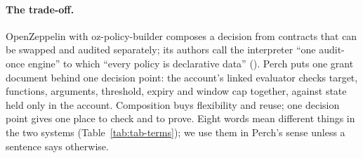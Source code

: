 \paragraph{The trade-off.} OpenZeppelin with oz-policy-builder composes a
decision from contracts that can be swapped and audited separately; its authors
call the interpreter ``one audit-once engine'' to which ``every policy is
declarative data'' (). Perch
puts one grant document behind one decision point: the account's linked
evaluator checks target, functions, arguments, threshold, expiry and window cap
together, against state held only in the account. Composition buys flexibility
and reuse; one decision point gives one place to check and to prove. Eight words
mean different things in the two systems (Table~\ref{tab:tab-terms}); we use them
in Perch's sense unless a sentence says otherwise.

